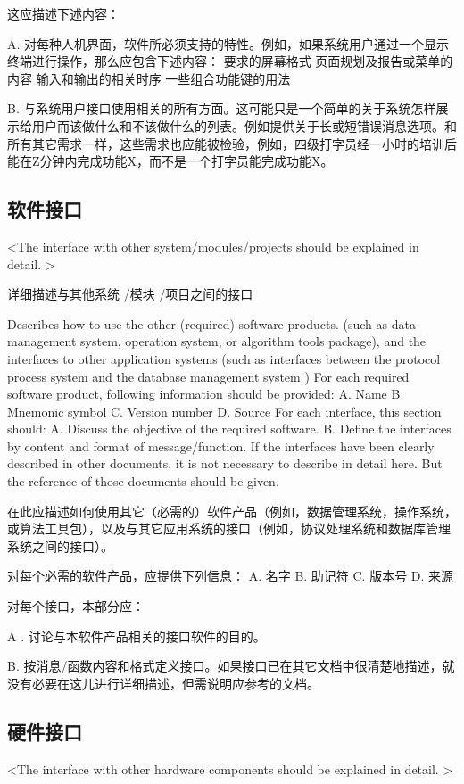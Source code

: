 这应描述下述内容：

A. 对每种人机界面，软件所必须支持的特性。例如，如果系统用户通过一个显示终端进行操作，那么应包含下述内容：
要求的屏幕格式
页面规划及报告或菜单的内容
输入和输出的相关时序
一些组合功能键的用法

B. 与系统用户接口使用相关的所有方面。这可能只是一个简单的关于系统怎样展示给用户而该做什么和不该做什么的列表。例如提供关于长或短错误消息选项。和所有其它需求一样，这些需求也应能被检验，例如，四级打字员经一小时的培训后能在Z分钟内完成功能X，而不是一个打字员能完成功能X。

\subsection{软件接口}
<The interface with other system/modules/projects should be explained in detail. >

详细描述与其他系统 /模块 /项目之间的接口

Describes how to use the other (required) software products. (such as data management system, operation system, or algorithm tools package), and the interfaces to other application systems (such as interfaces between the protocol process system and the database management system )
For each required software product, following information should be provided:
A. Name
B. Mnemonic symbol
C. Version number
D. Source
For each interface, this section should:
A. Discuss the objective of the required software.
B. Define the interfaces by content and format of message/function. If the interfaces have been clearly described in other documents, it is not necessary to describe in detail here. But the reference of those documents should be given.

在此应描述如何使用其它（必需的）软件产品（例如，数据管理系统，操作系统，或算法工具包），以及与其它应用系统的接口（例如，协议处理系统和数据库管理系统之间的接口）。

对每个必需的软件产品，应提供下列信息：
A.	名字
B.	助记符
C.	版本号
D.	来源

对每个接口，本部分应：

A .	讨论与本软件产品相关的接口软件的目的。

B.	按消息/函数内容和格式定义接口。如果接口已在其它文档中很清楚地描述，就没有必要在这儿进行详细描述，但需说明应参考的文档。

\subsection{硬件接口}
<The interface with other hardware components should be explained in detail. >

